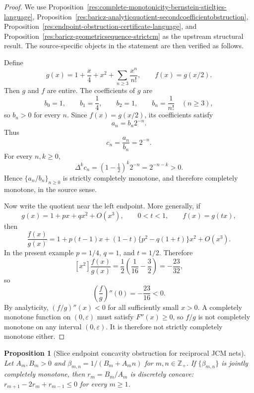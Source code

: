\documentclass[11pt]{article}
\numberwithin{equation}{section}
\newtheorem{proposition}[theorem]{Proposition}
\theoremstyle{definition}
\theoremstyle{remark}
\newcommand{\1}{\mathbf 1}
\begin{document}
\begin{proof}
We use Proposition~\ref{res:complete-monotonicity-bernstein-stieltjes-language}, Proposition~\ref{res:baricz-analyticquotient-secondcoefficientobstruction}, Proposition~\ref{res:endpoint-obstruction-certificate-language}, and Proposition~\ref{res:baricz-geometricsequence-strictcm} as the upstream structural result. The source-specific objects in the statement are then verified as follows.

Define
\[
g(x)=1+\frac{x}{4}+x^2+\sum_{n\ge3}\frac{x^n}{n!},
\qquad
f(x)=g(x/2).
\]
Then \(g\) and \(f\) are entire. The coefficients of \(g\) are
\[
b_0=1,\qquad b_1=\frac14,\qquad b_2=1,\qquad b_n=\frac1{n!}\quad(n\ge3),
\]
so \(b_n>0\) for every \(n\). Since \(f(x)=g(x/2)\), its coefficients satisfy
\[
a_n=b_n2^{-n}.
\]
Thus
\[
c_n=\frac{a_n}{b_n}=2^{-n}.
\]
For every \(n,k\ge0\),
\[
\Delta^k c_n=(1-\tfrac12)^k2^{-n}=2^{-n-k}>0.
\]
Hence \(\{a_n/b_n\}_{n\ge0}\) is strictly completely monotone, and therefore completely monotone, in the source sense.

Now write the quotient near the left endpoint. More generally, if
\[
g(x)=1+px+qx^2+O(x^3),\qquad 0<t<1,\qquad f(x)=g(tx),
\]
then
\[
\frac{f(x)}{g(x)}
=1+p(t-1)x+(1-t)\{p^2-q(1+t)\}x^2+O(x^3).
\]
In the present example \(p=1/4\), \(q=1\), and \(t=1/2\). Therefore
\[
[x^2]\frac{f(x)}{g(x)}
=\frac12\left(\frac1{16}-\frac32\right)
=-\frac{23}{32},
\]
so
\[
\left(\frac{f}{g}\right)''(0)=-\frac{23}{16}<0.
\]
By analyticity, \((f/g)''(x)<0\) for all sufficiently small \(x>0\). A completely monotone function on \((0,\varepsilon)\) must satisfy \(F''(x)\ge0\), so \(f/g\) is not completely monotone on any interval \((0,\varepsilon)\). It is therefore not strictly completely monotone either.
\end{proof}

\begin{proposition}[Slice endpoint concavity obstruction for reciprocal JCM nets]
\label{res:jcm-sliceendpoint-concavityobstruction}
Let \(A_m,B_m>0\) and \(\beta_{m,n}=1/(B_m+A_m n)\) for \(m,n\in\mathbb Z_+\). If \(\{\beta_{m,n}\}\) is jointly completely monotone, then \(r_m=B_m/A_m\) is discretely concave: \(r_{m+1}-2r_m+r_{m-1}\le0\) for every \(m\ge1\).
\end{proposition}
\end{document}
